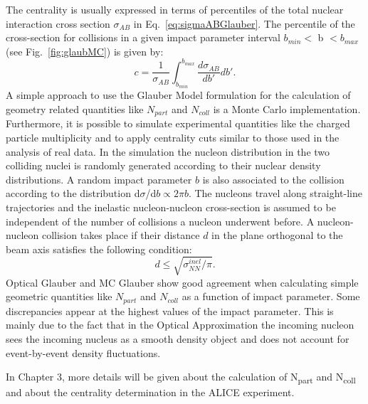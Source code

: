 The centrality is usually expressed in terms of percentiles of the total nuclear 
interaction cross section $\sigma_{AB}$ in Eq.~\ref{eq:sigmaABGlauber}.
The percentile of the cross-section for collisions in a given impact parameter
interval $b_{min}<$ b $<b_{max}$ (see Fig.~\ref{fig:glaubMC}) is given by:
\begin{equation}
c=\frac{1}{\sigma_{AB}}\int_{b_{min}}^{b_{max}} \frac{d\sigma_{AB}}{db'}db'.
\end{equation}
A simple approach to use the Glauber Model formulation for the
 calculation of geometry related quantities like $N_{part}$ and $N_{coll}$
is a Monte Carlo implementation. 
Furthermore, it is possible to simulate experimental quantities 
like the charged particle multiplicity and to apply centrality cuts similar to those used in the analysis of real data. 
In the simulation the nucleon distribution in the two colliding nuclei is randomly generated
according to their nuclear density distributions.
A random impact parameter $b$ is also associated to the collision according to the distribution
d$\sigma$/d$b \propto 2\pi b$. The nucleons travel along straight-line
trajectories and the inelastic nucleon-nucleon cross-section is assumed to be independent
of the number of collisions a nucleon underwent before. A nucleon-nucleon collision takes place if
their distance $d$ in the plane orthogonal to the beam axis satisfies the following condition:
\begin{equation}
d \leq \sqrt{\sigma^{inel}_{NN}/\pi}.
\end{equation}
Optical Glauber and MC Glauber show good agreement when calculating 
simple geometric quantities like $N_{part}$ and $N_{coll}$ as
a function of impact parameter. Some discrepancies appear at the highest values of the impact parameter.
This is mainly due to the fact that in the Optical Approximation the incoming nucleon sees the incoming nucleus as a smooth density object and does not account for event-by-event density fluctuations.



In Chapter 3, more details will be given about the calculation 
of N\textsubscript{part} and N\textsubscript{coll} and about the centrality 
determination in the ALICE experiment.


